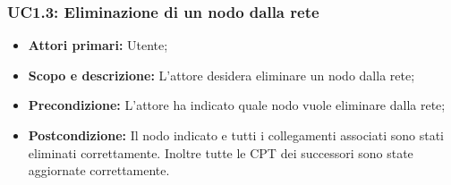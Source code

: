 \subsubsection{UC1.3: Eliminazione di un nodo dalla rete} 
\begin{itemize} 
	\item{\textbf{Attori primari:} Utente;} 
	\item{\textbf{Scopo e descrizione:} L'attore desidera eliminare un nodo dalla rete;} 
	\item{\textbf{Precondizione:} L'attore ha indicato quale nodo vuole eliminare dalla rete;} 
	\item{\textbf{Postcondizione:} Il nodo indicato e tutti i collegamenti associati sono stati eliminati correttamente. Inoltre tutte le CPT dei successori sono state aggiornate correttamente.} 
\end{itemize} 
